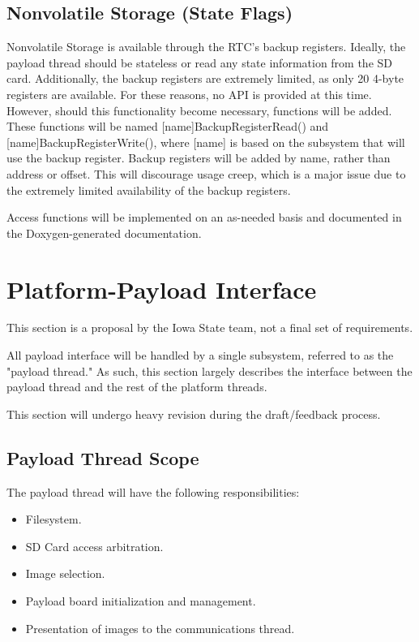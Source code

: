 \documentclass{article}
\begin{document}
\subsection{Nonvolatile Storage (State Flags)}
Nonvolatile Storage is available through the RTC's backup registers.
Ideally, the payload thread should be stateless or read any state information
from the SD card. Additionally, the backup registers are extremely limited, as
only 20 4-byte registers are available. For these reasons, no API is provided
at this time. However, should this functionality become necessary, functions
will be added. These functions will be named [name]BackupRegisterRead()
and [name]BackupRegisterWrite(), where [name] is 
based on the subsystem that will use the backup register.
Backup registers will be added by name, rather than address or offset.
This will discourage usage creep, which is a major issue due to the
extremely limited availability of the backup registers.

Access functions will be implemented on an as-needed basis and documented in the
Doxygen-generated documentation. 

\section{Platform-Payload Interface}
This section is a proposal by the Iowa State team, not
a final set of requirements.

All payload interface will be handled by a single subsystem, referred to as the
"payload thread." As such, this section largely describes the interface between
the payload thread and the rest of the platform threads.

This section will undergo heavy revision during the draft/feedback process.

\subsection{Payload Thread Scope}
The payload thread will have the following responsibilities:
\begin{itemize}
    \item Filesystem.
    \item SD Card access arbitration.
    \item Image selection.
    \item Payload board initialization and management.
    \item Presentation of images to the communications thread.
\end{itemize}
\end{document}
